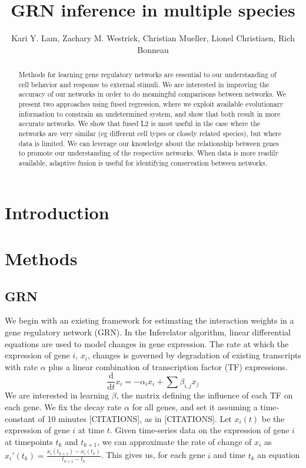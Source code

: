 \documentclass[11pt]{article}
\begin{document}
\title{GRN inference in multiple species}
\author{Kari Y. Lam, Zachary M. Westrick, Christian Mueller, Lionel Christiaen, Rich Bonneau}
\maketitle

\begin{abstract}
Methods for learning gene regulatory networks are essential to our understanding of cell behavior and response to external stimuli. We are interested in improving the accuracy of our networks in order to do meaningful comparisons between networks. We present two approaches using fused regression, where we exploit available evolutionary information to constrain an undetermined system, and show that both result in more accurate networks. We show that fused L2 is most useful in the case where the networks are very similar (eg different cell types or closely related species), but where data is limited. We can leverage our knowledge about the relationship between genes to promote our understanding of the respective networks. When data is more readily available, adaptive fusion is useful for identifying conservation between networks. 

\end{abstract}

\section{Introduction}

\section{Methods}
\subsection{GRN}
We begin with an existing framework for estimating the interaction weights in a gene regulatory network (GRN). In the Inferelator algorithm, linear differential equations are used to model changes in gene expression. The rate at which the expression of gene $i$, $x_i$, changes is governed by degradation of existing transcripts with rate $\alpha$ plus a linear combination of transcription factor (TF) expressions.
\begin{equation}
\frac{\mathrm d}{\mathrm d t} x_i = -\alpha_{i}x_{i} + \sum \beta_{i,j}x_{j}
\end{equation}
We are interested in learning $\beta$, the matrix defining the influence of each TF on each gene. We fix the decay rate $\alpha$ for all genes, and set it assuming a time-constant of 10 minutes [CITATIONS], as in [CITATIONS]. Let $x_i(t)$ be the expression of gene $i$ at time $t$. Given time-series data on the expression of gene $i$ at timepoints $t_k$ and $t_{k+1}$, we can approximate the rate of change of $x_i$ as $x_i'(t_k)=\frac{x_i(t_{k+1})-x_i(t_k)}{t_{k+1}-t_k}$. This gives us, for each gene $i$ and time $t_{k}$ an equation
\end{document}
